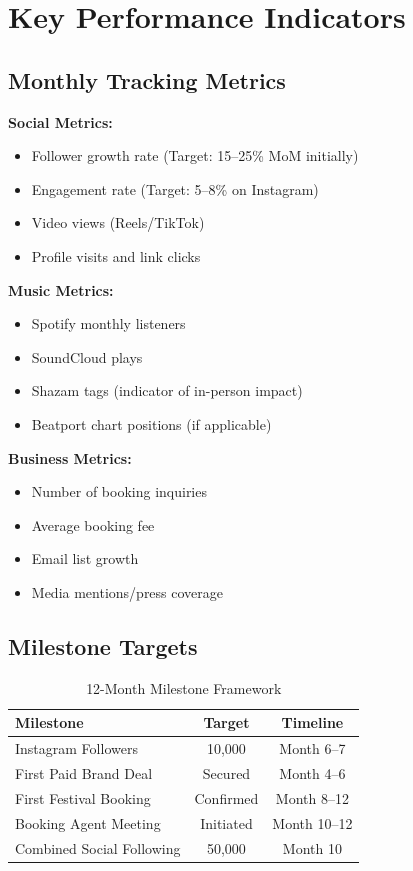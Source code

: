 \documentclass[11pt,a4paper]{article}
\begin{document}
\section{Key Performance Indicators}

\subsection{Monthly Tracking Metrics}

\noindent\textbf{Social Metrics:}
\begin{itemize}[leftmargin=*]
    \item Follower growth rate (Target: 15--25\% MoM initially)
    \item Engagement rate (Target: 5--8\% on Instagram)
    \item Video views (Reels/TikTok)
    \item Profile visits and link clicks
\end{itemize}

\noindent\textbf{Music Metrics:}
\begin{itemize}[leftmargin=*]
    \item Spotify monthly listeners
    \item SoundCloud plays
    \item Shazam tags (indicator of in-person impact)
    \item Beatport chart positions (if applicable)
\end{itemize}

\noindent\textbf{Business Metrics:}
\begin{itemize}[leftmargin=*]
    \item Number of booking inquiries
    \item Average booking fee
    \item Email list growth
    \item Media mentions/press coverage
\end{itemize}

\subsection{Milestone Targets}

\begin{table}[h!]
\centering
\renewcommand{\arraystretch}{1.3}
\begin{tabularx}{\textwidth}{X c c}
\toprule
\rowcolor{amaraprimary}
\textcolor{amaracream}{\textbf{Milestone}} & \textcolor{amaracream}{\textbf{Target}} & \textcolor{amaracream}{\textbf{Timeline}} \\
\midrule
Instagram Followers & 10,000 & Month 6--7 \\
First Paid Brand Deal & Secured & Month 4--6 \\
First Festival Booking & Confirmed & Month 8--12 \\
Booking Agent Meeting & Initiated & Month 10--12 \\
Combined Social Following & 50,000 & Month 10 \\
\bottomrule
\end{tabularx}
\caption{12-Month Milestone Framework}
\end{table}
\end{document}
